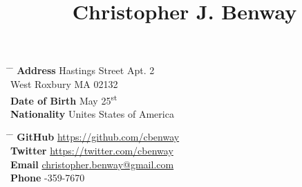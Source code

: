 \documentclass[letterpaper, 10pt]{article}
\date{\vspace{-10ex}}
\begin{document}
\title{\vspace{-12ex}Christopher J. Benway}

\maketitle


\parbox[t]{0.5\textwidth}{
\begin{tabbing}
\hspace{3cm} \= \hspace{4cm} \= \kill
{\bf Address}  Hastings Street Apt. 2\\
\> West Roxbury MA 02132 \\
{\bf Date of Birth}  May 25\textsuperscript{st} \\
{\bf Nationality} \> Unites States of America \\
\end{tabbing}
}
\hfil
\parbox[t]{0.5\textwidth}{
\begin{tabbing}
\hspace{2cm} \= \hspace{4cm} \= \kill
{\bf GitHub} \> \href{https://github.com/cbenway}{https://github.com/cbenway} \\
{\bf Twitter} \> \href{https://twitter.com/cbenway}{https://twitter.com/cbenway} \\
{\bf Email} \> \href{mailto:christopher.benway@gmail.com}{christopher.benway@gmail.com} \\
{\bf Phone} -359-7670
\end{tabbing}
}

\end{document}
